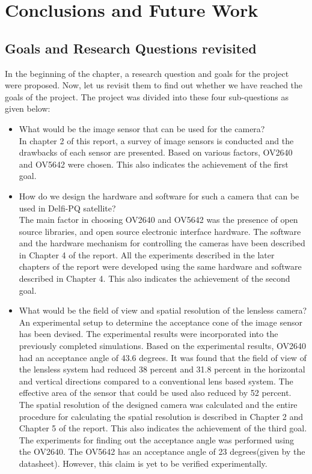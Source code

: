 \chapter{Conclusions and Future Work}
\label{chp:conclusionsandfuturework}

\section{Goals and Research Questions revisited}
In the beginning of the chapter, a research question and goals for the project were proposed. Now, let us revisit them to find out whether we have reached the goals of the project. The project was divided into these four sub-questions as given below:
\begin{itemize}
\item What would be the image sensor that can be used for the camera? \\
In chapter 2 of this report, a survey of image sensors is conducted and the drawbacks of each sensor are presented. Based on various factors, OV2640 and OV5642 were chosen. This also indicates the achievement of the first goal.
\item How do we design the hardware and software for such a camera that can be used in Delfi-PQ satellite?\\
The main factor in choosing OV2640 and OV5642 was the presence of open source libraries,  and open source electronic interface hardware. The software and the hardware mechanism for controlling the cameras have been described in Chapter 4 of the report. All the experiments described in the later chapters of the report were developed using the same hardware and software described in Chapter 4. This also indicates the achievement of the second goal.
\item What would be the field of view and spatial resolution of the lensless camera?\\
An experimental setup to determine the acceptance cone of the image sensor has been devised. The experimental results were incorporated into the previously completed simulations. Based on the experimental results, OV2640 had an acceptance angle of 43.6 degrees. It was found that the field of view of the lensless system had reduced 38 percent and 31.8 percent in the horizontal and vertical directions compared to a conventional lens based system. The effective area of the sensor that could be used also reduced by 52 percent. The spatial resolution of the designed camera was calculated and the entire procedure for calculating the spatial resolution is described in Chapter 2 and Chapter 5 of the report. This also indicates the achievement of the third goal. The experiments for finding out the acceptance angle was performed using the OV2640. The OV5642 has an acceptance angle of 23 degrees(given by the datasheet). However, this claim is yet to be verified experimentally.

\end{itemize}
